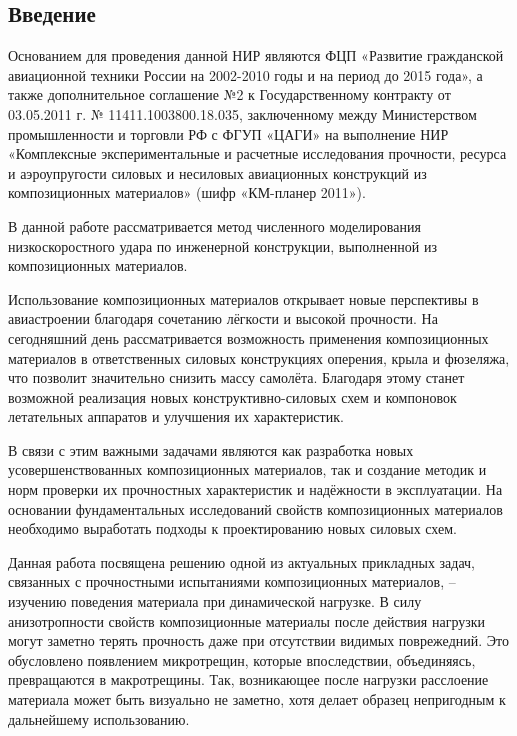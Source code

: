 \begin{center}\section*{Введение}\end{center}

Основанием для проведения данной НИР являются ФЦП «Развитие гражданской авиационной техники России на 2002-2010 годы и на период до 2015 года», а также дополнительное соглашение №2 к Государственному контракту от 03.05.2011 г. № 11411.1003800.18.035, заключенному между Министерством промышленности и торговли РФ с ФГУП «ЦАГИ» на выполнение НИР «Комплексные экспериментальные и расчетные исследования прочности, ресурса и аэроупругости силовых и несиловых авиационных конструкций из композиционных материалов» (шифр «КМ-планер 2011»).

В данной работе рассматривается метод численного моделирования низкоскоростного
удара по инженерной конструкции, выполненной из композиционных материалов.

Использование композиционных материалов открывает новые перспективы в авиастроении 
благодаря сочетанию лёгкости и высокой прочности. На сегодняшний день рассматривается 
возможность применения композиционных материалов в ответственных силовых конструкциях 
оперения, крыла и фюзеляжа, что позволит значительно снизить массу самолёта. Благодаря этому 
станет возможной реализация новых конструктивно-силовых схем и компоновок летательных 
аппаратов и улучшения их характеристик.

В связи с этим важными задачами являются как разработка новых усовершенствованных 
композиционных материалов, так и создание методик и норм проверки их прочностных характеристик 
и надёжности в эксплуатации. На основании фундаментальных исследований свойств композиционных 
материалов необходимо выработать подходы к проектированию новых силовых схем.

Данная работа посвящена решению одной из актуальных прикладных задач, связанных с 
прочностными испытаниями композиционных материалов, -- изучению поведения материала при 
динамической нагрузке. В силу анизотропности свойств композиционные материалы после
действия нагрузки могут заметно терять прочность даже при отсутствии видимых поврежедний.
Это обусловлено появлением микротрещин, которые впоследствии, объединяясь,
превращаются в макротрещины. Так, возникающее после нагрузки расслоение
материала может быть визуально не заметно, хотя делает образец непригодным к
дальнейшему использованию.


